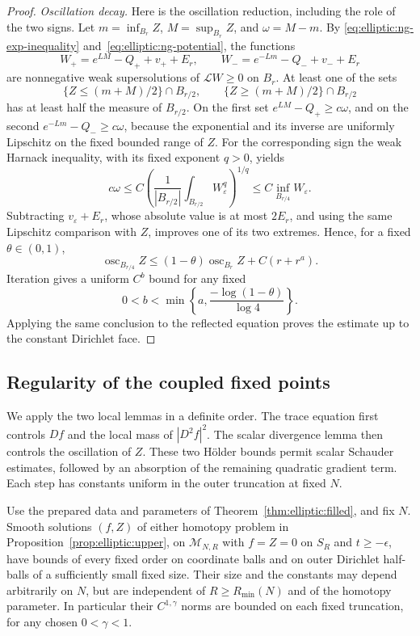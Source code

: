 \begin{proof}
\medskip\noindent\emph{Oscillation decay.}
Here is the oscillation reduction, including the role of the two
signs.  Let $m=\inf_{B_r}Z$, $M=\sup_{B_r}Z$, and $\omega=M-m$.
By \eqref{eq:elliptic:ng-exp-inequality} and~\eqref{eq:elliptic:ng-potential}, the functions
\[
 W_+=e^{LM}-Q_++v_++E_r,
 \qquad
 W_-=e^{-Lm}-Q_-+v_-+E_r
\]
are nonnegative weak supersolutions of $\mathcal L W\ge0$ on $B_r$.
At least one of the sets
\[
 \{Z\le(m+M)/2\}\cap B_{r/2},\qquad
 \{Z\ge(m+M)/2\}\cap B_{r/2}
\]
has at least half the measure of $B_{r/2}$.  On the first set
$e^{LM}-Q_+\ge c\omega$, and on the second
$e^{-Lm}-Q_-\ge c\omega$, because the exponential and its inverse
are uniformly Lipschitz on the fixed bounded range of $Z$.
For the corresponding sign the weak Harnack inequality, with its
fixed exponent $q>0$, yields
\[
 c\omega\le
 C\left(\frac1{|B_{r/2}|}\int_{B_{r/2}}W_\varepsilon^q\right)^{1/q}
 \le C\inf_{B_{r/4}}W_\varepsilon.
\]
Subtracting $v_\varepsilon+E_r$, whose absolute value is at most
$2E_r$, and using the same Lipschitz comparison with $Z$, improves
one of its two extremes.  Hence, for a fixed $\theta\in(0,1)$,
\begin{equation}\label{eq:elliptic:ng-oscillation-decay}
 \operatorname{osc}_{B_{r/4}}Z
 \le (1-\theta)\operatorname{osc}_{B_r}Z+C(r+r^a).
\end{equation}
Iteration gives a uniform $C^b$ bound for any fixed
\[
 0<b<\min\left\{a,\frac{-\log(1-\theta)}{\log4}\right\}.
\]
Applying the same conclusion to the reflected equation proves the
estimate up to the constant Dirichlet face.

\end{proof}

\subsection{Regularity of the coupled fixed points}

We apply the two local lemmas in a definite order.  The trace equation
first controls $Df$ and the local mass of $|D^2f|^2$.  The scalar
divergence lemma then controls the oscillation of $Z$.  These two
H\"older bounds permit scalar Schauder estimates, followed by an
absorption of the remaining quadratic gradient term.  Each step has
constants uniform in the outer truncation at fixed $N$.

\begin{proposition}\label{prop:elliptic:regularity}
Use the prepared data and parameters of Theorem~\ref{thm:elliptic:filled},
and fix $N$.  Smooth solutions $(f,Z)$ of either homotopy problem in
Proposition~\ref{prop:elliptic:upper}, on $\mathcal M_{N,R}$ with
$f=Z=0$ on $S_R$ and $t\ge-\epsilon$, have bounds of every fixed order on coordinate
balls and on outer Dirichlet half-balls of a sufficiently small fixed
size.  Their size and the constants may depend arbitrarily on $N$,
but are independent of $R\ge R_{\min}(N)$ and of the homotopy
parameter.  In particular their $C^{1,\gamma}$ norms are bounded on
each fixed truncation, for any chosen $0<\gamma<1$.
\end{proposition}

